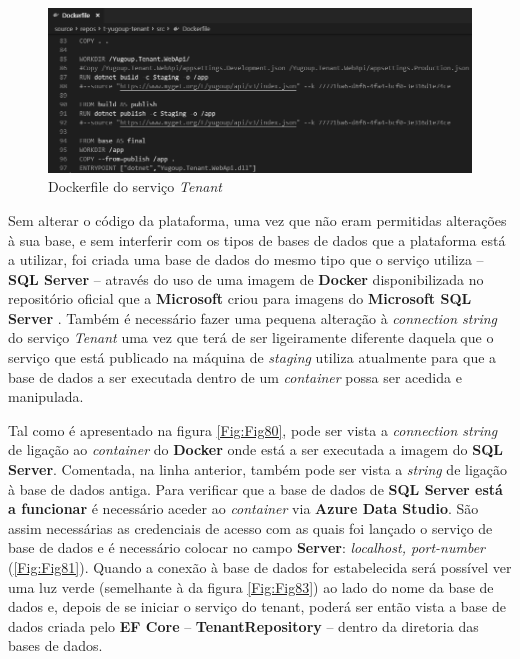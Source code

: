 \begin{figure}[hbt!]
\centering
\includegraphics[width=0.9\linewidth]{Cap6/TenantDockerfilePublish.png}
\caption{Dockerfile do serviço \textit{Tenant}}
\label{Fig:Fig79}
\end{figure}

\hspace{1cm}Sem alterar o código da plataforma, uma vez que não eram permitidas alterações à sua base, e sem interferir com os tipos de bases de dados que a plataforma está a utilizar, foi criada uma base de dados do mesmo tipo que o serviço utiliza -- \textbf{SQL Server} -- através do uso de uma imagem de \textbf{Docker} disponibilizada no repositório oficial que a \textbf{Microsoft} criou para imagens do \textbf{Microsoft SQL Server} \cite{dockersqlserver}. Também é necessário fazer uma pequena alteração à \textit{connection string} do serviço \textit{Tenant} uma vez que terá de ser ligeiramente diferente daquela que o serviço que está publicado na máquina de \textit{staging} utiliza atualmente para que a base de dados a ser executada dentro de um \textit{container} possa ser acedida e manipulada. 

    \hspace{1cm}Tal como é apresentado na figura \ref{Fig:Fig80}, pode ser vista a \textit{connection string} de ligação ao \textit{container} do \textbf{Docker} onde está a ser executada a imagem do \textbf{SQL Server}. Comentada, na linha anterior, também pode ser vista a \textit{string} de ligação à base de dados antiga. Para verificar que a base de dados de \textbf{SQL Server está a funcionar} é necessário aceder ao \textit{container} via \textbf{Azure Data Studio}. São assim necessárias as credenciais de acesso com as quais foi lançado o serviço de base de dados e é necessário colocar no campo \textbf{Server}: \textit{localhost, port-number} (\ref{Fig:Fig81}). Quando a conexão à base de dados for estabelecida será possível ver uma luz verde (semelhante à da figura \ref{Fig:Fig83}) ao lado do nome da base de dados e, depois de se iniciar o serviço do tenant, poderá ser então vista a base de dados criada pelo \textbf{EF Core} -- \textbf{TenantRepository} -- dentro da diretoria das bases de dados.

